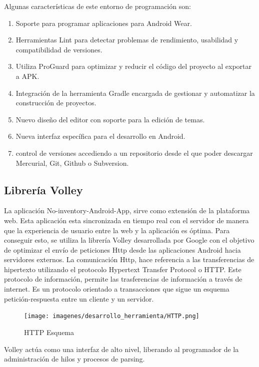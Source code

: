 \documentclass[a4paper,11pt]{book}
\begin{document}
Algunas características\cite{as2} de este entorno de programación son:

\begin{enumerate}
\item Soporte para programar aplicaciones para Android Wear.
\item Herramientas Lint para detectar problemas de rendimiento, usabilidad y compatibilidad de versiones.
\item Utiliza ProGuard para optimizar y reducir el código del proyecto al exportar a APK.\item Integración de la herramienta Gradle encargada de gestionar y automatizar la construcción de proyectos.
\item Nuevo diseño del editor con soporte para la edición de temas. 
\item Nueva interfaz específica para el desarrollo en Android.
\item control de versiones accediendo a un repositorio desde el que poder descargar Mercurial, Git, Github o Subversion. 
\end{enumerate}

\subsection{Librería Volley}
La aplicación No-inventory-Android-App, sirve como extensión de la plataforma web. Esta aplicación esta sincronizada en tiempo real con el servidor de manera que la experiencia de usuario entre la web y la aplicación es óptima.  Para conseguir esto, se utiliza la librería Volley\cite{volley} desarrollada por Google con el objetivo de optimizar el envío de peticiones Http desde las aplicaciones Android hacia servidores externos. La comunicación Http, hace referencia a las transferencias de hipertexto utilizando el protocolo Hypertext Transfer Protocol o HTTP\cite{http}. Este protocolo de información, permite las trasferencias de información a través de internet. Es un protocolo orientado a transacciones que sigue un esquema petición-respuesta entre un cliente y un servidor. 

\begin{figure}[H] 
\centering 
\texttt{[image: imagenes/desarrollo\_herramienta/HTTP.png]}
\caption{ HTTP Esquema\cite{httpD}}
\end{figure}

Volley actúa como una interfaz de alto nivel, liberando al programador de la administración de hilos y procesos de parsing. 
\end{document}
